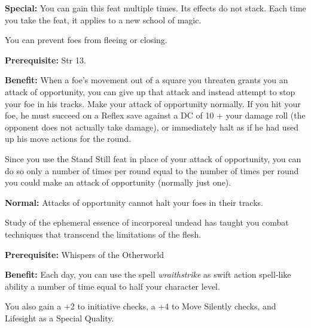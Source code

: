 \textbf{Special:} You can gain this feat multiple times. Its effects do not stack. Each time you take the feat, it applies to a new school of magic.


You can prevent foes from fleeing or closing.

\textbf{Prerequisite:} Str 13.

\textbf{Benefit:} When a foe's movement out of a square you threaten grants you an attack of opportunity, you can give up that attack and instead attempt to stop your foe in his tracks. Make your attack of opportunity normally. If you hit your foe, he must succeed on a Reflex save against a DC of 10 + your damage roll (the opponent does not actually take damage), or immediately halt as if he had used up his move actions for the round.

Since you use the Stand Still feat in place of your attack of opportunity, you can do so only a number of times per round equal to the number of times per round you could make an attack of opportunity (normally just one).

\textbf{Normal:} Attacks of opportunity cannot halt your foes in their tracks.





Study of the ephemeral essence of incorporeal undead has taught you combat techniques
that transcend the limitations of the flesh.

\textbf{Prerequisite:} Whispers of the Otherworld

\textbf{Benefit:} Each day, you can use the spell \textit{wraithstrike} as swift
action spell-like ability a number of time equal to half your character level.

You also gain a +2 to initiative checks, a +4 to Move Silently checks, and Lifesight
as a Special Quality.
